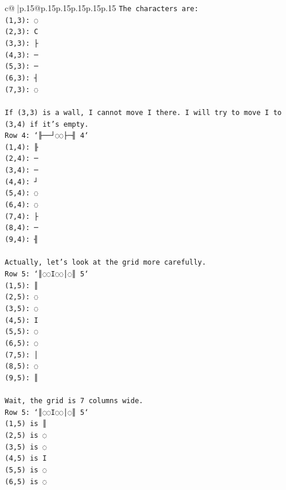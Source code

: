 \documentclass{article}
\begin{document}
{\begin{supertabular}{c@{$\;$}|p{.15\linewidth}@{}p{.15\linewidth}p{.15\linewidth}p{.15\linewidth}p{.15\linewidth}p{.15\linewidth}}
{{{\texttt{The characters are:} \\
\texttt{(1,3): ◌} \\
\texttt{(2,3): C} \\
\texttt{(3,3): ├} \\
\texttt{(4,3): ─} \\
\texttt{(5,3): ─} \\
\texttt{(6,3): ┤} \\
\texttt{(7,3): ◌} \\
\\ 
\texttt{If (3,3) is a wall, I cannot move I there. I will try to move I to (3,4) if it's empty.} \\
\texttt{Row 4: `╟──┘◌◌├─╢ 4`} \\
\texttt{(1,4): ╟} \\
\texttt{(2,4): ─} \\
\texttt{(3,4): ─} \\
\texttt{(4,4): ┘} \\
\texttt{(5,4): ◌} \\
\texttt{(6,4): ◌} \\
\texttt{(7,4): ├} \\
\texttt{(8,4): ─} \\
\texttt{(9,4): ╢} \\
\\ 
\texttt{Actually, let's look at the grid more carefully.} \\
\texttt{Row 5: `║◌◌I◌◌│◌║ 5`} \\
\texttt{(1,5): ║} \\
\texttt{(2,5): ◌} \\
\texttt{(3,5): ◌} \\
\texttt{(4,5): I} \\
\texttt{(5,5): ◌} \\
\texttt{(6,5): ◌} \\
\texttt{(7,5): │} \\
\texttt{(8,5): ◌} \\
\texttt{(9,5): ║} \\
\\ 
\texttt{Wait, the grid is 7 columns wide.} \\
\texttt{Row 5: `║◌◌I◌◌│◌║ 5`} \\
\texttt{(1,5) is ║} \\
\texttt{(2,5) is ◌} \\
\texttt{(3,5) is ◌} \\
\texttt{(4,5) is I} \\
\texttt{(5,5) is ◌} \\
\texttt{(6,5) is ◌} \\
}}}
\end{supertabular}}
\end{document}
